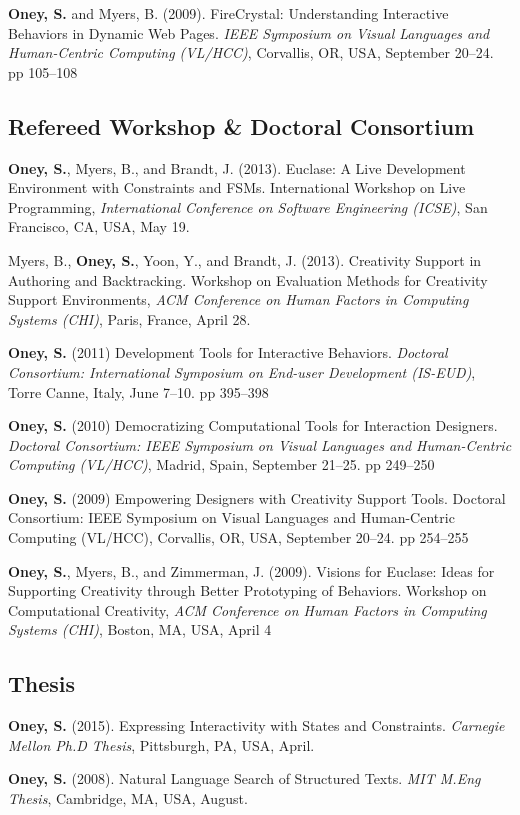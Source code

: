  {
\textbf{Oney, S.} and Myers, B. (2009). FireCrystal: Understanding Interactive Behaviors in Dynamic Web Pages. \textit{IEEE Symposium on Visual Languages and Human-Centric Computing (VL/HCC)}, Corvallis, OR, USA, September 20--24. pp 105--108
}

\subsection{Refereed Workshop \& Doctoral Consortium}

 {
\textbf{Oney, S.}, Myers, B., and Brandt, J. (2013). Euclase: A Live Development Environment with Constraints and FSMs. International Workshop on Live Programming, \textit{International Conference on Software Engineering (ICSE)}, San Francisco, CA, USA, May 19.
}

 {
Myers, B., \textbf{Oney, S.}, Yoon, Y., and Brandt, J. (2013). Creativity Support in Authoring and Backtracking. Workshop on Evaluation Methods for Creativity Support Environments, \textit{ACM Conference on Human Factors in Computing Systems (CHI)}, Paris, France, April 28.
}

 {
\textbf{Oney, S.} (2011) Development Tools for Interactive Behaviors. \textit{Doctoral Consortium: International Symposium on End-user Development (IS-EUD)}, Torre Canne, Italy, June 7--10. pp 395--398
}

 {
\textbf{Oney, S.} (2010) Democratizing Computational Tools for Interaction Designers. \textit{Doctoral Consortium: IEEE Symposium on Visual Languages and Human-Centric Computing (VL/HCC)}, Madrid, Spain, September 21--25. pp 249--250
}

 {
\textbf{Oney, S.} (2009) Empowering Designers with Creativity Support Tools. Doctoral Consortium: IEEE Symposium on Visual Languages and Human-Centric Computing (VL/HCC), Corvallis, OR, USA, September 20--24. pp 254--255
}

 {
\textbf{Oney, S.}, Myers, B., and Zimmerman, J. (2009). Visions for Euclase: Ideas for Supporting Creativity through Better Prototyping of Behaviors. Workshop on Computational Creativity, \textit{ACM Conference on Human Factors in Computing Systems (CHI)}, Boston, MA, USA, April 4
}

\subsection{Thesis}

 {
\textbf{Oney, S.} (2015). Expressing Interactivity with States and Constraints. \textit{Carnegie Mellon Ph.D Thesis}, Pittsburgh, PA, USA, April.
}

 {
\textbf{Oney, S.} (2008). Natural Language Search of Structured Texts. \textit{MIT M.Eng Thesis}, Cambridge, MA, USA, August.
}